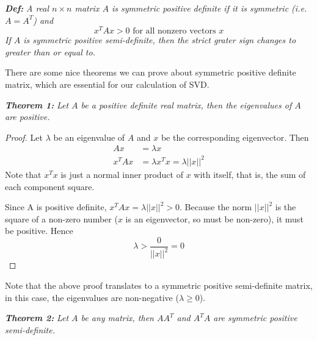 \documentclass{article}
\begin{document}
\textit{\textbf{Def:}} \textit{A real $n \times n$ matrix $A$ is symmetric positive definite if it is symmetric (i.e. $A=A^T$) and 
$$ x^T A x > 0 \text{ for all nonzero vectors }x$$
If $A$ is symmetric positive semi-definite, then the strict grater sign changes to greater than or equal to.}
\bigskip

There are some nice theorems we can prove about symmetric positive definite matrix, which are essential for our calculation of SVD.
\bigskip

\textit{\textbf{Theorem 1:}} \textit{Let $A$ be a positive definite real matrix, then the eigenvalues of $A$ are positive.}

\begin{proof}
Let $\lambda$ be an eigenvalue of $A$ and $x$ be the corresponding eigenvector. Then 
\begin{align*}
Ax &=\lambda x \\
x^T A x &= \lambda x^Tx  = \lambda || x ||^2 
\end{align*}
Note that $x^T x$ is just a normal inner product of $x$ with itself, that is, the sum of each component square.
  
Since A is positive definite, $x^T A x =\lambda ||x||^2> 0$. Because the norm $||x||^2 $ is the square of a non-zero number ($x$ is an eigenvector, so must be non-zero), it must be positive. Hence $$\lambda > \frac{0}{||x||^2} = 0$$
\end{proof}

Note that the above proof translates to a symmetric positive semi-definite matrix, in this case, the eigenvalues are non-negative ($\lambda \ge 0$).
\bigskip

\textit{\textbf{Theorem 2:}} \textit{Let $A$ be any matrix, then $AA^T$ and $A^TA$ are symmetric positive semi-definite.}
\end{document}
